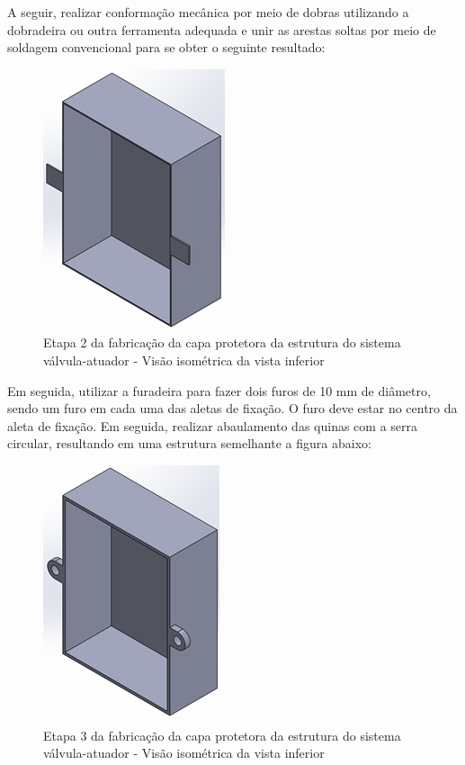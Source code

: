 A seguir, realizar conformação mecânica por meio de dobras utilizando a dobradeira ou outra ferramenta adequada e unir as arestas soltas por meio de soldagem convencional para se obter o seguinte resultado:
\begin{figure} [H]
    \centering
    \includegraphics[width=.3\textwidth]{Figuras/montagemAbastecimento/capa/etapa2.png}
    \caption{Etapa 2 da fabricação da capa protetora da estrutura do sistema válvula-atuador - Visão isométrica da vista inferior}
    \label{fig:etapa2}
\end{figure}

 Em seguida, utilizar a furadeira para fazer dois furos de 10 mm de diâmetro, sendo um furo em cada uma das aletas de fixação. O furo deve estar no centro da aleta de fixação. Em seguida, realizar abaulamento das quinas com a serra circular, resultando em uma estrutura semelhante a figura abaixo:
\begin{figure} [H]
    \centering
    \includegraphics[width=.3\textwidth]{Figuras/montagemAbastecimento/capa/etapa3.png}
    \caption{Etapa 3 da fabricação da capa protetora da estrutura do sistema válvula-atuador - Visão isométrica da vista inferior}
    \label{fig:etapa3}
\end{figure}

